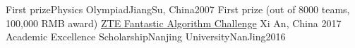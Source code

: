 \documentclass[11pt, a4paper]{awesome-cv}
\begin{document}
%
\begin{cvhonors}
    \cvhonor
    {First prize}{Physics Olympiad}{JiangSu, China}{2007}
    \cvhonor
    {First prize (out of 8000 teams, 100,000 RMB award)} %
    {\href{http://www.iqiyi.com/w\_19rto3v4h1.html}{ZTE Fantastic Algorithm Challenge}} %
    {Xi An, China} %
    {2017} %
    \cvhonor
    {Academic Excellence Scholarship}{Nanjing University}{NanJing}{2016}
\end{cvhonors}
\end{document}
